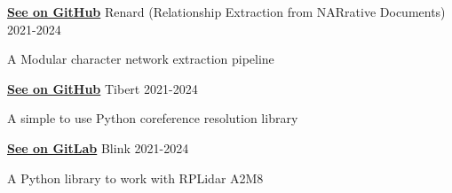 \documentclass[11pt, a4paper]{awesome-cv}
\begin{document}

\begin{cventries}

  \cventry
  {\href{https://github.com/CompNet/Renard}{\textbf{See on GitHub}}}
  {Renard (Relationship Extraction from NARrative Documents)}
  {}
  {2021-2024}
  {
    \begin{cvitems}
      \item A Modular character network extraction pipeline
    \end{cvitems}
  }

  \cventry
  {\href{https://github.com/CompNet/Tibert}{\textbf{See on GitHub}}}
  {Tibert}
  {}
  {2021-2024}
  {
    \begin{cvitems}
      \item A simple to use Python coreference resolution library
    \end{cvitems}
  }

  \cventry
  {\href{https://gitlab.com/sharpattack/blink}{\textbf{See on GitLab}}}
  {Blink}
  {}
  {2021-2024}
  {
    \begin{cvitems}
      \item A Python library to work with RPLidar A2M8
    \end{cvitems}
  }

\end{cventries}
\end{document}
